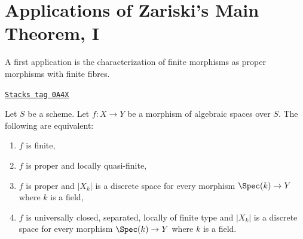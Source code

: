 \section{Applications of Zariski's Main Theorem, I}
\label{spaces-more-morphisms-section-applications-zmt}
A first application is the characterization of finite
morphisms as proper morphisms with finite fibres.

\begin{lemma}
\label{spaces-more-morphisms-lemma-characterize-finite}
\href{https://stacks.math.columbia.edu/tag/0A4X}{\texttt{Stacks tag 0A4X}}

Let $S$ be a scheme. Let $f : X \to Y$ be a morphism of algebraic spaces
over $S$. The following are equivalent:
\begin{enumerate}
\item $f$ is finite,
\item $f$ is proper and locally quasi-finite,
\item $f$ is proper and $|X_k|$ is a discrete space for every morphism
$\Spec(k) \to Y$ where $k$ is a field,
\item $f$ is universally closed, separated, locally of finite type
and $|X_k|$ is a discrete space for every morphism $\Spec(k) \to Y$
where $k$ is a field.
\end{enumerate}
\end{lemma}

